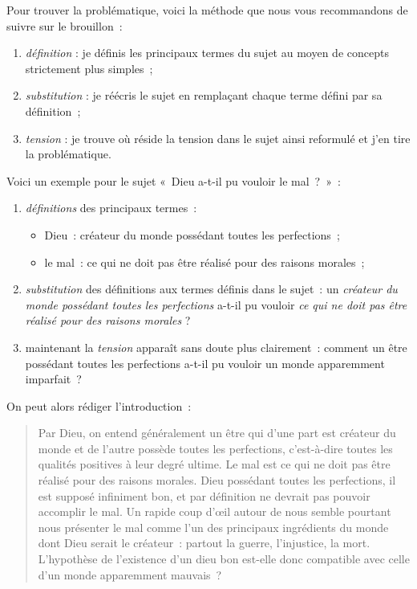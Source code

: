 \documentclass[a4paper,12pt]{article}
\begin{document}
Pour trouver la problématique, voici la méthode que nous vous
recommandons de suivre sur le brouillon :

\begin{enumerate}
\item \emph{définition} : je définis les principaux termes du sujet au moyen de
concepts strictement plus simples ;

\item \emph{substitution} : je réécris le sujet en remplaçant chaque terme
défini par sa définition ;

\item \emph{tension} : je trouve où réside la tension dans le sujet ainsi
reformulé et j'en tire la problématique.
\end{enumerate}

Voici un exemple pour le sujet « Dieu a-t-il pu vouloir le mal ? » :

\begin{enumerate}
\item \emph{définitions} des principaux termes :

\begin{itemize}
\item Dieu : créateur du monde possédant toutes les perfections ;

\item le mal : ce qui ne doit pas être réalisé pour des raisons
morales ;
\end{itemize}

\item \emph{substitution} des définitions aux termes définis dans le sujet : un
\emph{créateur du monde possédant toutes les perfections} a-t-il pu
vouloir \emph{ce qui ne doit pas être réalisé pour des raisons morales} ?

\item maintenant la \emph{tension} apparaît sans doute plus clairement : comment
un être possédant toutes les perfections a-t-il pu vouloir un monde
apparemment imparfait ?
\end{enumerate}

On peut alors rédiger l'introduction :

\begin{quote}
Par Dieu, on entend généralement un être qui d'une part est créateur
du monde et de l'autre possède toutes les perfections, c'est-à-dire
toutes les qualités positives à leur degré ultime. Le mal est ce qui
ne doit pas être réalisé pour des raisons morales. Dieu possédant
toutes les perfections, il est supposé infiniment bon, et par
définition ne devrait pas pouvoir accomplir le mal. Un rapide coup
d'œil autour de nous semble pourtant nous présenter le mal comme l'un
des principaux ingrédients du monde dont Dieu serait le créateur :
partout la guerre, l'injustice, la mort. L'hypothèse de l'existence
d'un dieu bon est-elle donc compatible avec celle d'un monde
apparemment mauvais ?
\end{quote}
\end{document}
